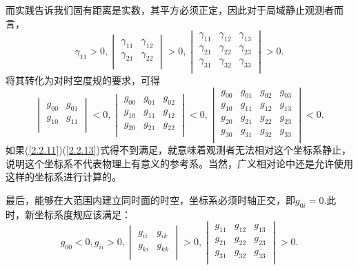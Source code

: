\documentclass[11pt, a4paper, oneside, onecolumn]{ctexart}
\numberwithin{equation}{subsection}
\begin{document}
而实践告诉我们固有距离是实数，其平方必须正定，因此对于局域静止观测者而言，
\begin{equation}
\gamma_{11}>0,\begin{vmatrix}
\gamma_{11} & \gamma_{12}\\
\gamma_{21} & \gamma_{22}\\
\end{vmatrix}>0,\begin{vmatrix}
\gamma_{11} & \gamma_{12} & \gamma_{13}\\
\gamma_{21} & \gamma_{22} & \gamma_{23}\\
\gamma_{31} & \gamma_{32} & \gamma_{33}\\
\end{vmatrix}>0.
\end{equation}
将其转化为对时空度规的要求，可得
\begin{equation}
\begin{vmatrix}
g_{00} & g_{01}\\
g_{10} & g_{11}\\
\end{vmatrix}<0,
\begin{vmatrix}
g_{00} & g_{01} & g_{02}\\
g_{10} & g_{11} & g_{12}\\
g_{20} & g_{21} & g_{22}\\
\end{vmatrix}<0,
\begin{vmatrix}
g_{00} & g_{01} & g_{02} & g_{03}\\
g_{10} & g_{11} & g_{12} & g_{13}\\
g_{20} & g_{21} & g_{22} & g_{23}\\
g_{30} & g_{31} & g_{32} & g_{33}\\
\end{vmatrix}<0.\label{2.2.13}
\end{equation}
如果(\ref{2.2.11})(\ref{2.2.13})式得不到满足，就意味着观测者无法相对这个坐标系静止，说明这个坐标系不代表物理上有意义的参考系。当然，广义相对论中还是允许使用这样的坐标系进行计算的。

最后，能够在大范围内建立同时面的时空，坐标系必须时轴正交，即$g_{0i}=0$.此时，新坐标系度规应该满足：
\begin{equation}
g_{00}<0,g_{ii}>0,
\begin{vmatrix}
g_{ii} & g_{ik}\\
g_{ki} & g_{kk}\\
\end{vmatrix}>0,
\begin{vmatrix}
g_{11} & g_{12} & g_{13}\\
g_{21} & g_{22} & g_{23}\\
g_{31} & g_{32} & g_{33}\\
\end{vmatrix}>0.
\end{equation}
\end{document}
